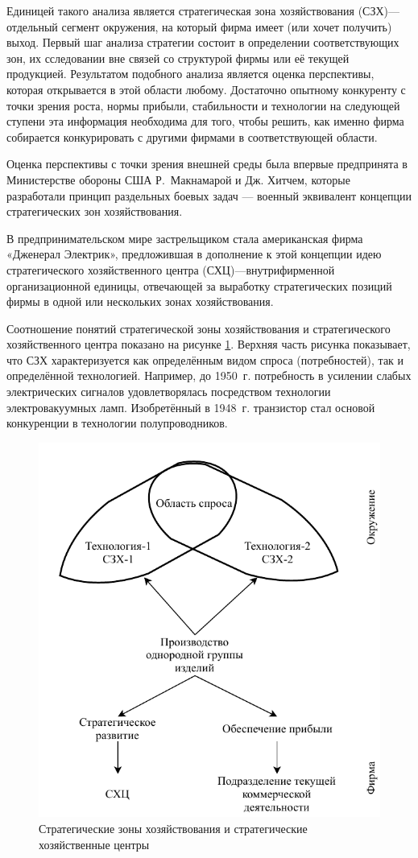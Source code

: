 Единицей такого анализа является стратегическая зона хозяйствования (СЗХ)—отдельный сегмент окружения, на который фирма имеет (или хочет получить) выход. Первый шаг анализа стратегии состоит в определении соответствующих зон, их сследовании вне связей со структурой фирмы или её текущей продукцией. Результатом подобного анализа является оценка перспективы, которая открывается в этой области любому. Достаточно опытному конкуренту с точки зрения роста, нормы прибыли, стабильности и технологии на следующей ступени эта информация необходима для того, чтобы решить, как именно фирма собирается конкурировать с другими фирмами в соответствующей области.

Оценка перспективы с точки зрения внешней среды была впервые предпринята в Министерстве обороны США Р. Макнамарой и Дж. Хитчем, которые разработали принцип раздельных боевых задач — военный эквивалент концепции стратегических зон хозяйствования.

В предпринимательском мире застрельщиком стала американская фирма «Дженерал Электрик», предложившая в дополнение к этой концепции идею стратегического хозяйственного центра (СХЦ)—внутрифирменной организационной единицы, отвечающей за выработку стратегических позиций фирмы в одной или нескольких зонах хозяйствования.

Соотношение понятий стратегической зоны хозяйствования и стратегического хозяйственного центра показано на рисунке \ref{fig:diagram-page-3}. Верхняя часть рисунка показывает, что СЗХ характеризуется как определённым видом спроса (потребностей), так и определённой технологией. Например, до 1950 г. потребность в усилении слабых электрических сигналов удовлетворялась посредством технологии электровакуумных ламп. Изобретённый в 1948 г. транзистор стал основой конкуренции в технологии полупроводников.

\begin{figure}[h]
	\centering
	\includegraphics[width=0.7\linewidth]{Diagram-Page-3}
	\caption{Стратегические зоны хозяйствования и стратегические хозяйственные центры}
	\label{fig:diagram-page-3}
\end{figure}


